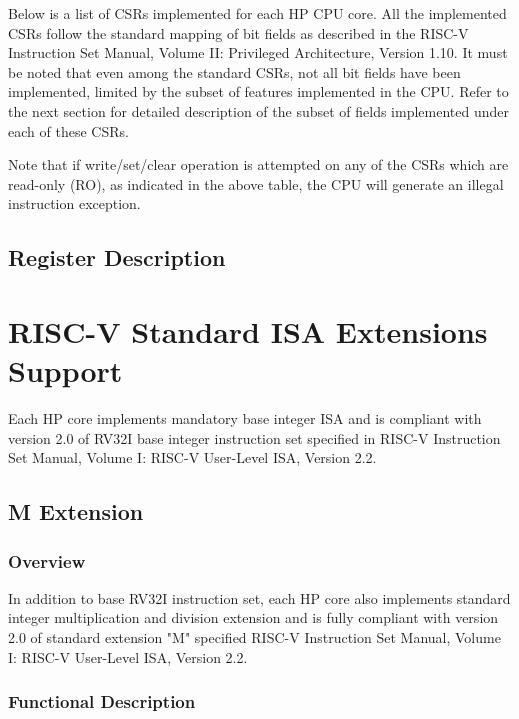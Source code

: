 \documentclass[main\_\_EN.tex]{subfiles}
\begin{document}
Below is a list of CSRs implemented for each HP CPU core. All the implemented CSRs follow the standard mapping of bit fields as described in the RISC-V Instruction Set Manual, Volume II: Privileged Architecture, Version 1.10. It must be noted that even among the standard CSRs, not all bit fields have been implemented, limited by the subset of features implemented in the CPU. Refer to the next section for detailed description of the subset of fields implemented under each of these CSRs.


Note that if write/set/clear operation is attempted on any of the CSRs which are read-only (RO), as indicated in the above table, the CPU will generate an illegal instruction exception.

\subsection{Register Description}


\newpage
\section{RISC-V Standard ISA Extensions Support}

Each HP core implements mandatory base integer ISA and is compliant with version 2.0 of RV32I base integer instruction set specified in RISC-V Instruction Set Manual, Volume I: RISC-V User-Level ISA, Version 2.2.

\subsection{M Extension}
\label{sec:riscvcpu-mext}
\subsubsection{Overview}
\label{sec:riscvcpu-mext-overview}
In addition to base RV32I instruction set, each HP core also implements standard integer multiplication and division extension and is fully compliant with version 2.0 of standard extension "M" specified RISC-V Instruction Set Manual, Volume I: RISC-V User-Level ISA, Version 2.2.

\subsubsection{Functional Description}
\label{sec:riscvcpu-mext-func-descr}
\end{document}
